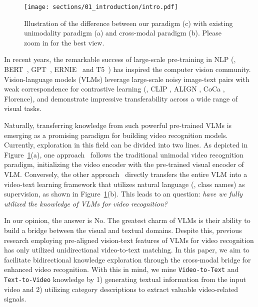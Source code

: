 \documentclass[10pt,twocolumn,letterpaper]{article}
\begin{document}
\begin{figure}
\begin{center}
\texttt{[image: sections/01\_introduction/intro.pdf]}
\end{center}
\caption{Illustration of the difference between our paradigm (c) with existing unimodality paradigm (a) and cross-modal paradigm (b). Please zoom in for the best view.
}
\label{fig:overview}
\end{figure}







In recent years, the remarkable success of large-scale pre-training in NLP (\eg, BERT~\cite{devlin2018bert}, GPT~\cite{GPT,GPT3}, ERNIE~\cite{zhang2019ernie} and T5~\cite{2020t5}) has inspired the computer vision community. 
Vision-language models (VLMs) leverage large-scale noisy image-text pairs with weak correspondence for contrastive learning (\eg, CLIP \cite{CLIP}, ALIGN \cite{ALIGN}, CoCa \cite{yu2022coca}, Florence\cite{yuan2021florence}), and demonstrate impressive transferability across a wide range of visual tasks. 

Naturally, transferring knowledge from such powerful pre-trained VLMs is emerging as a promising paradigm for building video recognition models. 
Currently, exploration in this field can be divided into two lines. 
As depicted in Figure~\ref{fig:overview}(a), one approach~\cite{st-adaptor,evl,yang2023aim} follows the traditional unimodal video recognition paradigm, initializing the video encoder with the pre-trained visual encoder of VLM. Conversely, the other approach~\cite{wang2021actionclip,ju2022prompting,x-clip,text4vis} directly transfers the entire VLM into a video-text learning framework that utilizes natural language (\ie, class names) as supervision, as shown in Figure~\ref{fig:overview}(b).
This leads to an question: \emph{have we fully utilized the knowledge of VLMs for video recognition?}


In our opinion, the answer is No. The greatest charm of VLMs is their ability to build a bridge between the visual and textual domains. 
Despite this, previous research employing pre-aligned vision-text features of VLMs for video recognition has only utilized unidirectional video-to-text matching.
In this paper, we aim to facilitate bidirectional knowledge exploration through the cross-modal bridge for enhanced video recognition.
With this in mind, we mine \texttt{Video-to-Text} and \texttt{Text-to-Video} knowledge by 1) generating textual information from the input video and 2) utilizing category descriptions to extract valuable video-related signals.
\end{document}
